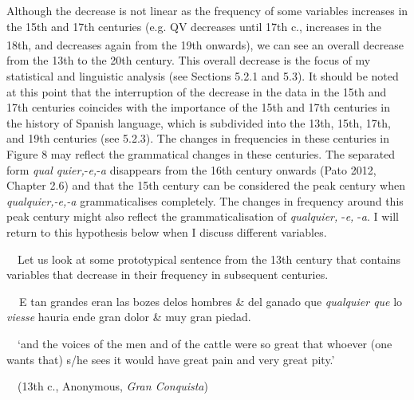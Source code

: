 \begin{styleStandard}
Although the decrease is not linear as the frequency of some variables increases in the 15th and 17th centuries (e.g. QV decreases until 17th c., increases in the 18th, and decreases again from the 19th\textsuperscript{ }onwards), we can see an overall decrease from the 13th to the 20th century. This overall decrease is the focus of my statistical and linguistic analysis (see Sections 5.2.1 and 5.3). It should be noted at this point that the interruption of the decrease in the data in the 15th and 17th centuries coincides with the importance of the 15th and 17th centuries in the history of Spanish language, which is subdivided into the 13th, 15th, 17th, and 19th centuries (see 5.2.3). The changes in frequencies in these centuries in Figure 8 may reflect the grammatical changes in these centuries. The separated form \textit{qual quier,}\nobreakdash-\textit{e,}\nobreakdash-\textit{a} disappears from the 16th century onwards (Pato 2012, Chapter 2.6) and that the 15th century can be considered the peak century when \textit{qualquier,-e,-a} grammaticalises completely. The changes in frequency around this peak century might also reflect the grammaticalisation of \textit{qualquier,} \nobreakdash-\textit{e,} \nobreakdash-\textit{a}. I will return to this hypothesis below when I discuss different variables.
\end{styleStandard}

\begin{styleStandard}
\ \ Let us look at some prototypical sentence from the 13th century that contains variables that decrease in their frequency in subsequent centuries. 
\end{styleStandard}

\begin{styleStandard}
\textbf{\ \ }E tan grandes eran las bozes delos hombres \& del ganado que \textit{qualquier que} lo \textit{viesse} hauria ende gran dolor \& muy gran piedad. 
\end{styleStandard}

\begin{styleStandard}
\ \ ‘and the voices of the men and of the cattle were so great that whoever (one wants that) s/he sees it would have great pain and very great pity.’
\end{styleStandard}

\begin{styleStandard}
\ \ (13th c., Anonymous,\textit{ Gran Conquista})
\end{styleStandard}

